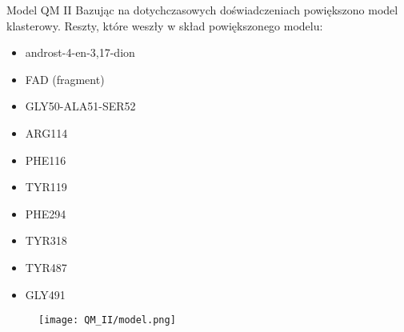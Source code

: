 \begin{section}{Model QM II}
Bazując na dotychczasowych doświadczeniach powiększono model klasterowy. Reszty, które weszły w skład powiększonego modelu:
 \begin{itemize}
  \item androst-4-en-3,17-dion
  \item FAD (fragment)
  \item GLY50-ALA51-SER52
  \item {\color{green} ARG114}
  \item {\color{green} PHE116}
  \item TYR119
  \item {\color{green} PHE294}
  \item TYR318
  \item TYR487
  \item GLY491
 \end{itemize}

 \begin{figure}[H]
  \texttt{[image: QM\_II/model.png]}
\end{figure}

 
\end{section}
